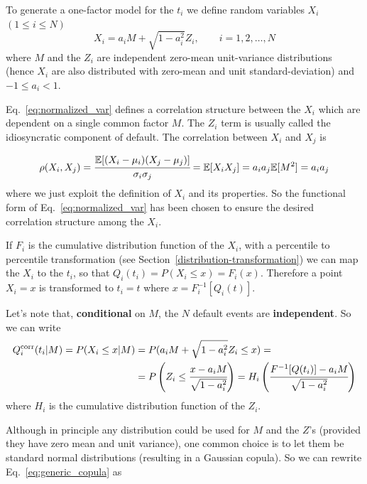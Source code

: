 To generate a one-factor model for the \(t_i\) we define random
variables \(X_i\) \((1\le i \le N)\)
\begin{equation}
X_i = a_i M + \sqrt{1-a_i^2}Z_i,\qquad i = 1, 2,\ldots, N
\label{eq:normalized_var}
\end{equation}
where \(M\) and the \(Z_i\) are independent zero-mean unit-variance  distributions (hence $X_i$ are also distributed with zero-mean and unit standard-deviation) and \(-1 \le a_i \lt 1\).

Eq.~\ref{eq:normalized_var} defines a correlation structure between the
\(X_i\) which are dependent on a single common factor \(M\). The $Z_i$ term is usually 
called the idiosyncratic component of default. 
The correlation between \(X_i\) and \(X_j\) is

\[
\rho(X_i, X_j) = \cfrac{\mathbb{E}[(X_i-\mu_i)(X_j-\mu_j)]}{\sigma_{i}\sigma_{j}} =\mathbb{E}[X_i X_j] = a_i a_j \mathbb{E}[M^2] = a_i a_j
\]
where we just exploit the definition of $X_i$ and its properties.
So the functional form of Eq.~\ref{eq:normalized_var} has been chosen to ensure the desired correlation structure among the $X_i$.

If $F_i$ is the cumulative distribution function of the $X_i$,
with a percentile to percentile transformation (see Section~\ref{distribution-transformation}) we can map the \(X_i\) to the \(t_i\), so that $Q_i(t_i) = P(X_i\le x)=F_i(x)$.
Therefore a point \(X_i = x\) is transformed to \(t_i = t\) where
\(x = F_i^{-1}[Q_i(t)]\).

Let's note that, \textbf{conditional} on $M$, the $N$ default events are \textbf{independent}. So we can write
\begin{equation}
\begin{split}
Q_i^{\textrm{corr}}(t_i|M) = P(X_i\le x|M) &= P(a_i M + \sqrt{1-a_i^2}Z_i\le x) =\\
&= P\left(Z_i\le \cfrac{x-a_i M}{\sqrt{1-a_i^2}}\right)
=H_i\left(\cfrac{F^{-1}[Q(t_i)]-a_i M}{\sqrt{1-a_i^2}}\right)
\end{split}
\label{eq:generic_copula}
\end{equation}
where $H_i$ is the cumulative distribution function of the $Z_i$.

Although in principle any distribution could be used for \(M\) and the
\(Z\)'s (provided they have zero mean and unit variance), one common
choice is to let them be standard normal distributions (resulting in a
Gaussian copula).
So we can rewrite Eq.~\ref{eq:generic_copula} as

